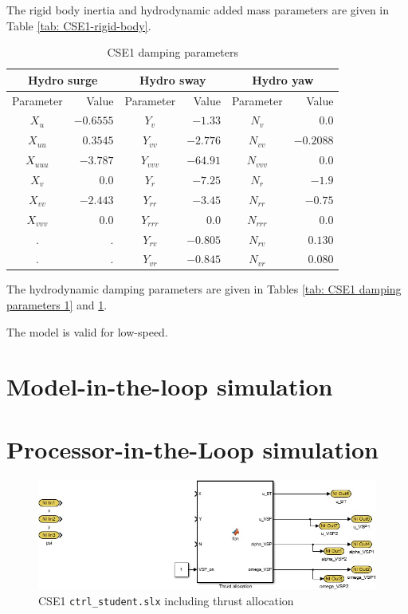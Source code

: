 \documentclass[a4paper,twoside,english]{report}
\providecommand{\tabularnewline}{\\}
\begin{document}
The rigid body inertia and hydrodynamic added mass parameters are
given in Table \ref{tab: CSE1-rigid-body}.

\begin{table}
\begin{centering}
\begin{tabular}{crcrcr}
\multicolumn{2}{c}{Hydro surge} & \multicolumn{2}{c}{Hydro sway} & \multicolumn{2}{c}{Hydro yaw}\tabularnewline
\midrule 
{Parameter}  & {Value}  & {Parameter}  & {Value}  & {Parameter}  & {Value} \tabularnewline
\midrule 
$X_{u}$  & $-0.6555$  & $Y_{v}$  & $-1.33$  & $N_{v}$  & $0.0$ \tabularnewline
$X_{uu}$  & $0.3545$  & $Y_{vv}$  & $-2.776$  & $N_{vv}$  & $-0.2088$ \tabularnewline
$X_{uuu}$  & $-3.787$  & $Y_{vvv}$  & $-64.91$  & $N_{vvv}$  & $0.0$ \tabularnewline
$X_{v}$  & $0.0$  & $Y_{r}$  & $-7.25$  & $N_{r}$  & $-1.9$ \tabularnewline
$X_{vv}$  & $-2.443$  & $Y_{rr}$  & $-3.45$  & $N_{rr}$  & $-0.75$ \tabularnewline
$X_{vvv}$  & $0.0$  & $Y_{rrr}$  & $0.0$  & $N_{rrr}$  & $0.0$ \tabularnewline
$.$  & $.$  & $Y_{rv}$  & $-0.805$  & $N_{rv}$  & $0.130$ \tabularnewline
$.$  & $.$  & $Y_{vr}$  & $-0.845$  & $N_{vr}$  & $0.080$ \tabularnewline
\bottomrule
\end{tabular}
\par\end{centering}
\caption{\label{tab: CSE1 damping parameters 2}CSE1 damping parameters}
\end{table}

The hydrodynamic damping parameters are given in Tables \ref{tab: CSE1 damping parameters 1}
and \ref{tab: CSE1 damping parameters 2}.

The model is valid for low-speed.

\clearpage{}

\section{Model-in-the-loop simulation}

\clearpage{}

\section{Processor-in-the-Loop simulation}

\begin{figure}
\centering \includegraphics[scale=0.45]{fig/CSE1_ctrl_student} \caption{\label{fig: CSE1 ctrl_student.slx}CSE1 \texttt{ctrl\_student.slx}
including thrust allocation}
\end{figure}
\end{document}

